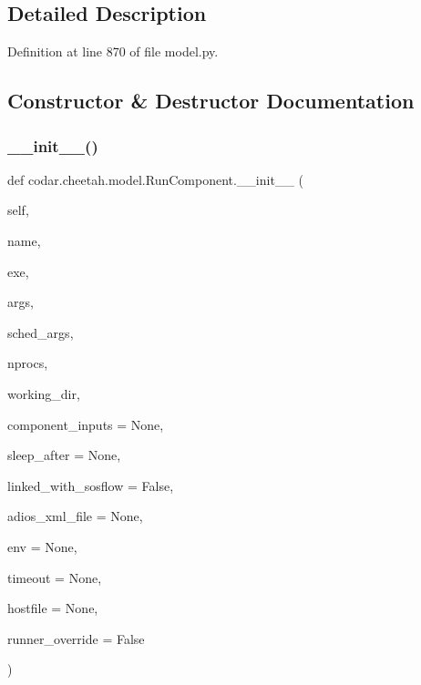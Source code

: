 \subsection{Detailed Description}


Definition at line 870 of file model.\+py.



\subsection{Constructor \& Destructor Documentation}
\mbox{\label{classcodar_1_1cheetah_1_1model_1_1_run_component_a3fefe66c8e1f1f912a617e900ba6c75b}} 
\subsubsection{\texorpdfstring{\+\_\+\+\_\+init\+\_\+\+\_\+()}{\_\_init\_\_()}}
{\footnotesize\ttfamily def codar.\+cheetah.\+model.\+Run\+Component.\+\_\+\+\_\+init\+\_\+\+\_\+ (\begin{DoxyParamCaption}\item[{}]{self,  }\item[{}]{name,  }\item[{}]{exe,  }\item[{}]{args,  }\item[{}]{sched\+\_\+args,  }\item[{}]{nprocs,  }\item[{}]{working\+\_\+dir,  }\item[{}]{component\+\_\+inputs = {\ttfamily None},  }\item[{}]{sleep\+\_\+after = {\ttfamily None},  }\item[{}]{linked\+\_\+with\+\_\+sosflow = {\ttfamily False},  }\item[{}]{adios\+\_\+xml\+\_\+file = {\ttfamily None},  }\item[{}]{env = {\ttfamily None},  }\item[{}]{timeout = {\ttfamily None},  }\item[{}]{hostfile = {\ttfamily None},  }\item[{}]{runner\+\_\+override = {\ttfamily False} }\end{DoxyParamCaption})}



